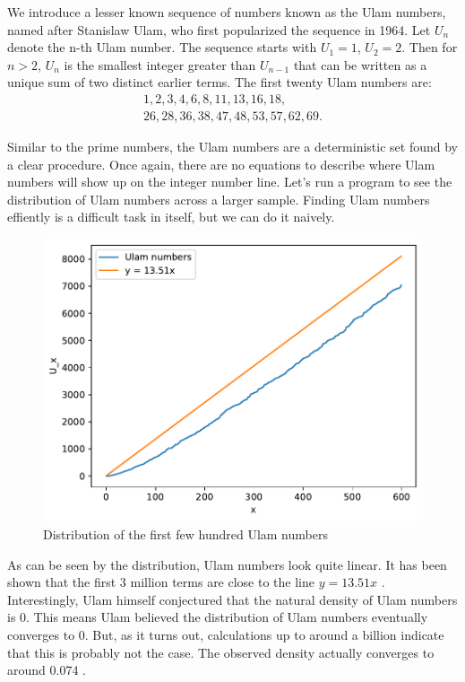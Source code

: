 \documentclass[conference]{IEEEtran}
\begin{document}
We introduce a lesser known sequence of numbers known as the Ulam numbers, named after Stanislaw Ulam, who first popularized the sequence in 1964. Let $U_n$ denote the n-th Ulam number. The sequence starts with $U_1 = 1$, $U_2 = 2$. Then for $n > 2$, $U_n$ is the smallest integer greater than $U_{n - 1}$ that can be written as a unique sum of two distinct earlier terms. The first twenty Ulam numbers are:
\begin{gather*}
  1, 2, 3, 4, 6, 8, 11, 13, 16, 18, \\
  26, 28, 36, 38, 47, 48, 53, 57, 62, 69.
\end{gather*}

Similar to the prime numbers, the Ulam numbers are a deterministic set found by a clear procedure. Once again, there are no equations to describe where Ulam numbers will show up on the integer number line. Let's run a program to see the distribution of Ulam numbers across a larger sample. Finding Ulam numbers effiently is a difficult task in itself, but we can do it naively. 

\begin{figure}[H]
  \centering
  \includegraphics[width=\linewidth,keepaspectratio]{../images/Ulam_distribution.pdf}
  \caption{Distribution of the first few hundred Ulam numbers}
\end{figure}

As can be seen by the distribution, Ulam numbers look quite linear. It has been shown that the first 3 million terms are close to the line $y = 13.51x$ \cite{b2}. Interestingly, Ulam himself conjectured that the natural density of Ulam numbers is 0. This means Ulam believed the distribution of Ulam numbers eventually converges to 0. But, as it turns out, calculations up to around a billion indicate that this is probably not the case. The observed density actually converges to around 0.074 \cite{b2}. 
\end{document}
